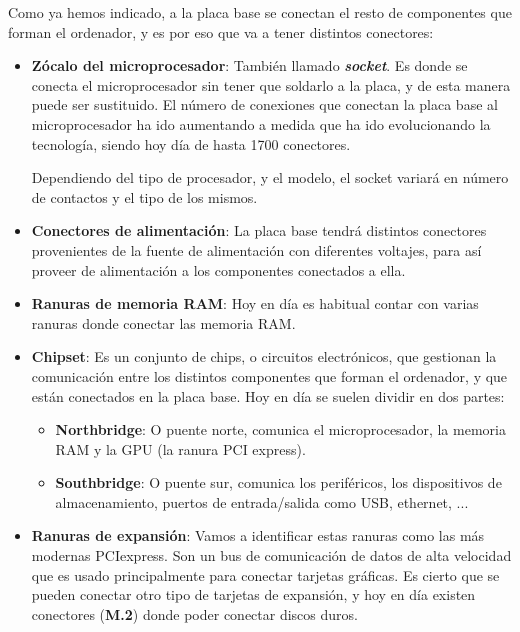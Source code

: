 Como ya hemos indicado, a la placa base se conectan el resto de componentes que forman el ordenador, y es por eso que va a tener distintos conectores:

\begin{itemize}
    \item \textbf{Zócalo del microprocesador}: También llamado \textit{\textbf{socket}}. Es donde se conecta el microprocesador sin tener que soldarlo a la placa, y de esta manera puede ser sustituido. El número de conexiones que conectan la placa base al microprocesador ha ido aumentando a medida que ha ido evolucionando la tecnología, siendo hoy día de hasta 1700 conectores.

    Dependiendo del tipo de procesador, y el modelo, el socket variará en número de contactos y el tipo de los mismos.

    \item \textbf{Conectores de alimentación}: La placa base tendrá distintos conectores provenientes de la fuente de alimentación con diferentes voltajes, para así proveer de alimentación a los componentes conectados a ella.

    \item \textbf{Ranuras de memoria RAM}: Hoy en día es habitual contar con varias ranuras donde conectar las memoria RAM.

    \item \textbf{Chipset}: Es un conjunto de chips, o circuitos electrónicos, que gestionan la comunicación entre los distintos componentes que forman el ordenador, y que están conectados en la placa base. Hoy en día se suelen dividir en dos partes:
    \begin{itemize}
        \item \textbf{Northbridge}: O puente norte, comunica el microprocesador, la memoria RAM y la GPU (la ranura PCI express).
        \item \textbf{Southbridge}: O puente sur, comunica los periféricos, los dispositivos de almacenamiento, puertos de entrada/salida como USB, ethernet, ...
    \end{itemize}

    \item \textbf{Ranuras de expansión}: Vamos a identificar estas ranuras como las más modernas  PCIexpress. Son un bus de comunicación de datos de alta velocidad que es usado principalmente para conectar tarjetas gráficas. Es cierto que se pueden conectar otro tipo de tarjetas de expansión, y hoy en día existen conectores (\textbf{M.2}) donde poder conectar discos duros.


\end{itemize}
